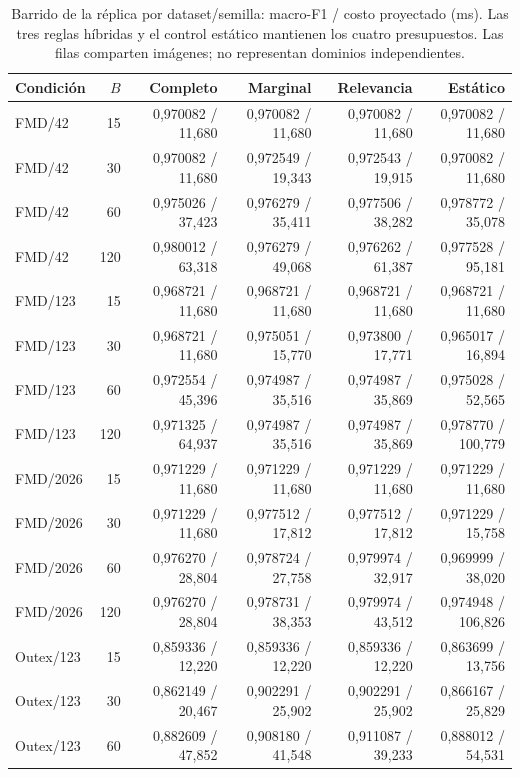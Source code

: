 \begin{table}[!htbp]\centering\fontsize{8}{10}\selectfont\setlength{\tabcolsep}{3pt}
\caption{Barrido de la réplica por dataset/semilla: macro-F1 / costo proyectado (ms). Las tres reglas híbridas y el control estático mantienen los cuatro presupuestos. Las filas comparten imágenes; no representan dominios independientes.}
\label{tab:replica-barrido}
\begin{tabular}{@{}lrrrrr@{}}
\toprule
Condición & $B$ & Completo & Marginal & Relevancia & Estático\\
\midrule
FMD/42 & 15 & 0,970082 / 11,680 & 0,970082 / 11,680 & 0,970082 / 11,680 & 0,970082 / 11,680\\
FMD/42 & 30 & 0,970082 / 11,680 & 0,972549 / 19,343 & 0,972543 / 19,915 & 0,970082 / 11,680\\
FMD/42 & 60 & 0,975026 / 37,423 & 0,976279 / 35,411 & 0,977506 / 38,282 & 0,978772 / 35,078\\
FMD/42 & 120 & 0,980012 / 63,318 & 0,976279 / 49,068 & 0,976262 / 61,387 & 0,977528 / 95,181\\
FMD/123 & 15 & 0,968721 / 11,680 & 0,968721 / 11,680 & 0,968721 / 11,680 & 0,968721 / 11,680\\
FMD/123 & 30 & 0,968721 / 11,680 & 0,975051 / 15,770 & 0,973800 / 17,771 & 0,965017 / 16,894\\
FMD/123 & 60 & 0,972554 / 45,396 & 0,974987 / 35,516 & 0,974987 / 35,869 & 0,975028 / 52,565\\
FMD/123 & 120 & 0,971325 / 64,937 & 0,974987 / 35,516 & 0,974987 / 35,869 & 0,978770 / 100,779\\
FMD/2026 & 15 & 0,971229 / 11,680 & 0,971229 / 11,680 & 0,971229 / 11,680 & 0,971229 / 11,680\\
FMD/2026 & 30 & 0,971229 / 11,680 & 0,977512 / 17,812 & 0,977512 / 17,812 & 0,971229 / 15,758\\
FMD/2026 & 60 & 0,976270 / 28,804 & 0,978724 / 27,758 & 0,979974 / 32,917 & 0,969999 / 38,020\\
FMD/2026 & 120 & 0,976270 / 28,804 & 0,978731 / 38,353 & 0,979974 / 43,512 & 0,974948 / 106,826\\
Outex/123 & 15 & 0,859336 / 12,220 & 0,859336 / 12,220 & 0,859336 / 12,220 & 0,863699 / 13,756\\
Outex/123 & 30 & 0,862149 / 20,467 & 0,902291 / 25,902 & 0,902291 / 25,902 & 0,866167 / 25,829\\
Outex/123 & 60 & 0,882609 / 47,852 & 0,908180 / 41,548 & 0,911087 / 39,233 & 0,888012 / 54,531\\

\end{tabular}
\end{table}
